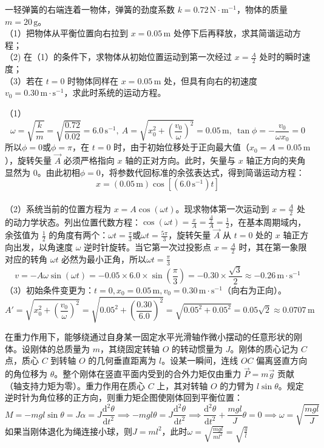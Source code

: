\begin{exercise}
一轻弹簧的右端连着一物体，弹簧的劲度系数 $k = 0.72\,\text{N}\cdot\text{m}^{-1}$，物体的质量 $m = 20\,\text{g}$。\\
（1）把物体从平衡位置向右拉到 $x = 0.05\,\text{m}$ 处停下后再释放，求其简谐运动方程；\\
（2) 在（1）的条件下，求物体从初始位置运动到第一次经过 $x = \frac{A}{2}$ 处时的瞬时速度；\\
（3）若在 $t = 0$ 时物体同样在 $x = 0.05\,\text{m}$ 处，但具有向右的初速度 $v_0 = 0.30\,\text{m}\cdot\text{s}^{-1}$，求此时系统的运动方程。
\end{exercise}
\begin{solution}
（1）$$\omega = \sqrt{\frac{k}{m}} = \sqrt{\frac{0.72}{0.02}}= 6.0\,\text{s}^{-1},~A = \sqrt{x_0^2 + \left(\frac{v_0}{\omega}\right)^2} = 0.05\,\text{m},~\tan\phi = -\frac{v_0}{\omega x_0} = 0 $$所以$\phi = 0 \text{或}\phi = \pi$，在 $t=0$ 时，由于初始位移处于正向最大值（$x_0 = A = 0.05\,\text{m}$），旋转矢量 $\vec{A}$ 必须严格指向 $x$ 轴的正对方向。此时，矢量与 $x$ 轴正方向的夹角显然为 $0$。由此初相$\phi = 0$，将参数代回标准的余弦表达式，得到简谐运动方程：\[x = (0.05\,\text{m})\cos\left[\left(6.0\,\text{s}^{-1}\right)t\right]\]\\
（2）系统当前的位置方程为 $x = A\cos(\omega t)$。现求物体第一次运动到 $x = \frac{A}{2}$ 处的动力学状态。列出位置代数方程：$\cos(\omega t) = \frac{x}{A} = \frac{\frac{A}{2}}{A} = \frac{1}{2}$，在基本周期域内，余弦值为 $\frac{1}{2}$ 的角度有两个：$\omega t = \frac{\pi}{3} \text{或}\omega t = \frac{5\pi}{3}$，旋转矢量 $\vec{A}$ 从 $t=0$ 处的 $x$ 轴正方向出发，以角速度 $\omega$ 逆时针旋转。当它第一次过投影点 $x = \frac{A}{2}$ 时，其在第一象限对应的转角 $\omega t$ 必然为最小正角，所以$\omega t = \frac{\pi}{3}$
\[v = -A\omega\sin(\omega t)= -0.05 \times 6.0 \times \sin\left(\frac{\pi}{3}\right) = -0.30 \times \frac{\sqrt{3}}{2} \approx -0.26\,\text{m}\cdot\text{s}^{-1}\]
（3）初始条件变更为：$t = 0, x_0 = 0.05\,\text{m}, v_0 = 0.30\,\text{m}\cdot\text{s}^{-1}$（向右为正向）。$$A' = \sqrt{x_0^2 + \left(\frac{v_0}{\omega}\right)^2} = \sqrt{0.05^2 + \left(\frac{0.30}{6.0}\right)^2} = \sqrt{0.05^2 + 0.05^2} = 0.05\sqrt{2} \approx 0.0707\,\text{m}$$
\end{solution}

\begin{definition}[复摆]
在重力作用下，能够绕通过自身某一固定水平光滑轴作微小摆动的任意形状的刚体。设刚体的总质量为 $m$，其绕固定转轴 $O$ 的转动惯量为 $J$。刚体的质心记为 $C$ 点，质心 $C$ 到转轴 $O$ 的几何垂直距离为 $l$。设某一瞬间，连线 $OC$ 偏离竖直方向的角位移为 $\theta$。整个刚体在竖直平面内受到的合外力矩仅由重力 $\vec{P} = m\vec{g}$ 贡献（轴支持力矩为零）。重力作用在质心 $C$ 上，其对转轴 $O$ 的力臂为 $l\sin\theta$。规定逆时针为角位移的正方向，则重力矩企图使刚体回到平衡位置：$$M = -mgl\sin\theta= J\alpha= J\frac{\mathrm{d}^2\theta}{\mathrm{d}t^2}\implies-mgl\theta = J\frac{\mathrm{d}^2\theta}{\mathrm{d}t^2} \implies \frac{\mathrm{d}^2\theta}{\mathrm{d}t^2} + \frac{mgl}{J}\theta = 0\implies\omega=\sqrt{ \frac{mgl}{J}}$$如果当刚体退化为绳连接小球，则$J=ml^2$，此时$\omega=\sqrt{ \frac{mgl}{ml^2}}=\sqrt{ \frac{g}{l}}$
\end{definition}

